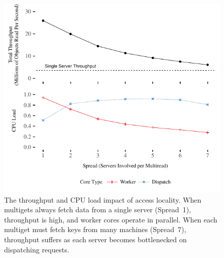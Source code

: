 \begin{figure}[t]
\centering
\includegraphics[width=1.0\columnwidth]{graphs/ramcloud-colocation.pdf}
\caption{The throughput and CPU load impact of access locality. When
multigets
always fetch data from a single server (Spread~1), throughput is high, and
worker cores operate in parallel. When each multiget must fetch keys from
many machines (Spread~7), throughput suffers as each server becomes
bottlenecked on dispatching requests.}
\label{fig:colocation}
\end{figure}
